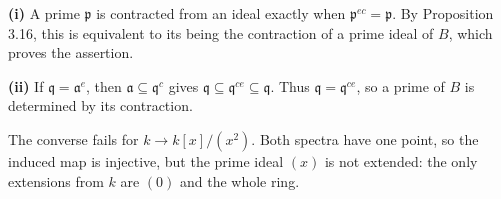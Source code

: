 \textbf{(i)} A prime $\mathfrak p$ is contracted from an ideal exactly when $\mathfrak p^{ec}=\mathfrak p$. By Proposition 3.16, this is equivalent to its being the contraction of a prime ideal of $B$, which proves the assertion.

\textbf{(ii)} If $\mathfrak q=\mathfrak a^e$, then $\mathfrak a\subseteq\mathfrak q^c$ gives $\mathfrak q\subseteq\mathfrak q^{ce}\subseteq\mathfrak q$. Thus $\mathfrak q=\mathfrak q^{ce}$, so a prime of $B$ is determined by its contraction.

The converse fails for $k\to k[x]/(x^2)$. Both spectra have one point, so the induced map is injective, but the prime ideal $(x)$ is not extended: the only extensions from $k$ are $(0)$ and the whole ring.
